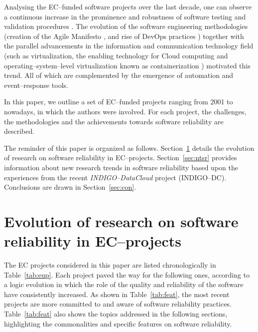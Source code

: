 \documentclass[journal]{IEEEtran}
\begin{document}
Analysing the EC--funded software projects over the last decade,
one can observe a continuous increase in the prominence and robustness of software
testing and validation procedures \cite{aiftimiei}. The
evolution of the software engineering methodologies (creation of the Agile
Manifesto \cite{agile-manifesto}, and rise of DevOps practices \cite{zhu}) together
with the parallel advancements in the information and communication technology
field (such as virtualization, the enabling technology for Cloud computing and
operating--system--level virtualization known as containerization \cite{soltesz}) motivated this trend. All of which
are complemented by the emergence of automation and event--response tools.

In this paper, we outline a set of EC--funded projects
ranging from 2001 to nowadays, in which the authors were involved.
For each project, the challenges, the methodologies and
the achievements towards software reliability are described.

The reminder of this paper is
organized as follows. Section~\ref{sec:ev} details the evolution of research on
software reliability in EC--projects. Section~\ref{sec:ntsr} provides
information about new research trends in software reliability based upon the
experiences from the recent {\sl INDIGO--DataCloud} project (INDIGO--DC). Conclusions are drawn in Section~\ref{sec:con}.

\section{Evolution of research on software reliability in EC--projects}
\label{sec:ev}

The EC projects considered in this paper are listed chronologically in Table~\ref{tab:eup}.
Each project paved the way for the following ones, according to a logic evolution in which
the role of the quality and reliability of the software have
consistently increased. As shown in Table~\ref{tab:feat}, the most recent projects are more
committed to and aware of software reliability practices.
Table~\ref{tab:feat} also shows the topics addressed in the following sections, highlighting
the commonalities and specific features on software reliability.
\end{document}
